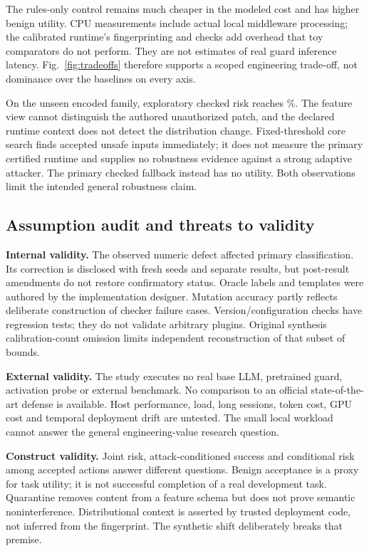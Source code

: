 \documentclass[lettersize,journal]{IEEEtran}
\begin{document}
The rules-only control remains much cheaper in the modeled cost and has higher
benign utility. CPU measurements include actual local middleware processing;
the calibrated runtime's fingerprinting and checks add overhead that toy
comparators do not perform. They are not estimates of real guard inference
latency. Fig.~\ref{fig:tradeoffs} therefore supports a scoped engineering
trade-off, not dominance over the baselines on every axis.

On the unseen encoded family, exploratory checked risk reaches
\resExploratoryShiftRisk{}\%. The feature view cannot distinguish the authored
unauthorized patch, and the declared runtime context does not detect the
distribution change. Fixed-threshold core search finds accepted unsafe inputs
immediately; it does not measure the primary certified runtime and supplies
no robustness evidence against a strong adaptive attacker.
The primary checked fallback instead has no utility. Both observations limit
the intended general robustness claim.

\subsection{Assumption audit and threats to validity}
\textbf{Internal validity.} The observed numeric defect affected primary
classification. Its correction is disclosed with fresh seeds and separate
results, but post-result amendments do not restore confirmatory status.
Oracle labels and templates were authored by the implementation designer.
Mutation accuracy partly reflects deliberate construction of checker failure
cases. Version/configuration checks have regression tests; they do not validate
arbitrary plugins. Original synthesis calibration-count omission limits
independent reconstruction of that subset of bounds.

\textbf{External validity.} The study executes no real base LLM, pretrained
guard, activation probe or external benchmark. No comparison to an official
state-of-the-art defense is available. Host performance, load, long sessions,
token cost, GPU cost and temporal deployment drift are untested. The small
local workload cannot answer the general engineering-value research question.

\textbf{Construct validity.} Joint risk, attack-conditioned success and
conditional risk among accepted actions answer different questions. Benign
acceptance is a proxy for task utility; it is not successful completion of a
real development task. Quarantine removes content from a feature schema but
does not prove semantic noninterference. Distributional context is asserted
by trusted deployment code, not inferred from the fingerprint. The synthetic
shift deliberately breaks that premise.
\end{document}
